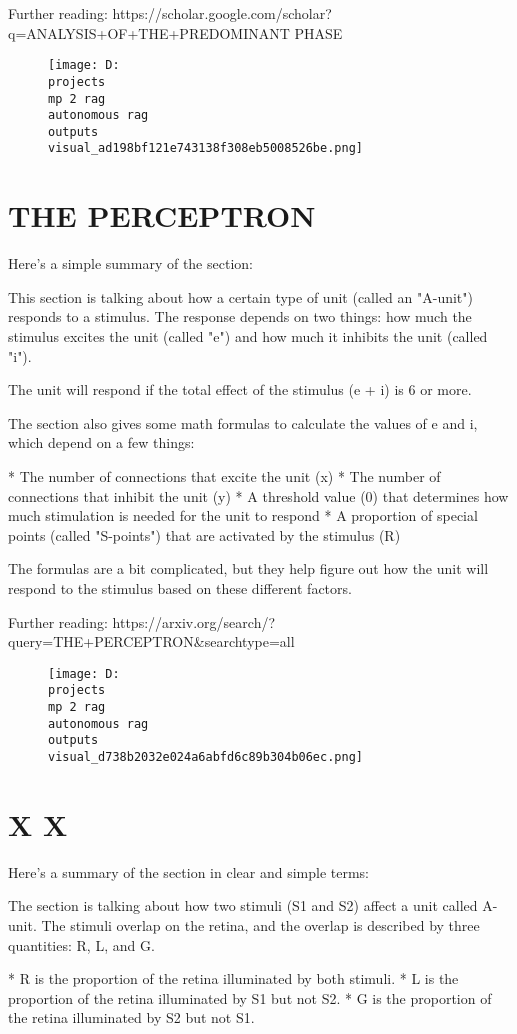 \documentclass[12pt,a4paper]{article}
\begin{document}
Further reading: https://scholar.google.com/scholar?q=ANALYSIS+OF+THE+PREDOMINANT
PHASE
\begin{figure}[h]
\centering
\texttt{[image: D:\\projects\\mp 2 rag\\autonomous rag\\outputs\\visual\_ad198bf121e743138f308eb5008526be.png]}
\end{figure}
\section{THE PERCEPTRON}
Here's a simple summary of the section:

This section is talking about how a certain type of unit (called an "A-unit") responds to a stimulus. The response depends on two things: how much the stimulus excites the unit (called "e") and how much it inhibits the unit (called "i").

The unit will respond if the total effect of the stimulus (e + i) is 6 or more.

The section also gives some math formulas to calculate the values of e and i, which depend on a few things:

* The number of connections that excite the unit (x)
* The number of connections that inhibit the unit (y)
* A threshold value (0) that determines how much stimulation is needed for the unit to respond
* A proportion of special points (called "S-points") that are activated by the stimulus (R)

The formulas are a bit complicated, but they help figure out how the unit will respond to the stimulus based on these different factors.

Further reading: https://arxiv.org/search/?query=THE+PERCEPTRON&searchtype=all
\begin{figure}[h]
\centering
\texttt{[image: D:\\projects\\mp 2 rag\\autonomous rag\\outputs\\visual\_d738b2032e024a6abfd6c89b304b06ec.png]}
\end{figure}
\section{X
X}
Here's a summary of the section in clear and simple terms:

The section is talking about how two stimuli (S1 and S2) affect a unit called A-unit. The stimuli overlap on the retina, and the overlap is described by three quantities: R, L, and G.

* R is the proportion of the retina illuminated by both stimuli.
* L is the proportion of the retina illuminated by S1 but not S2.
* G is the proportion of the retina illuminated by S2 but not S1.
\end{document}
